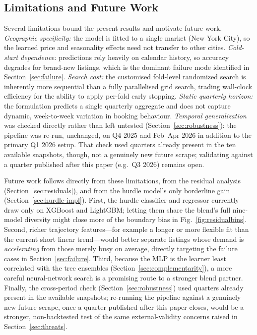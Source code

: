 \documentclass[journal]{IEEEtran}
\begin{document}
\subsection{Limitations and Future Work}
\label{sec:limitations}
Several limitations bound the present results and motivate future work.
\emph{Geographic specificity:} the model is fitted to a single market (New
York City), so the learned price and seasonality effects need not transfer to
other cities. \emph{Cold-start dependence:} predictions rely heavily on
calendar history, so accuracy degrades for brand-new listings, which is the
dominant failure mode identified in Section~\ref{sec:failure}.
\emph{Search cost:} the customised fold-level randomized search is inherently
more sequential than a fully parallelised grid search, trading wall-clock
efficiency for the ability to apply per-fold early stopping.
\emph{Static quarterly horizon:} the formulation predicts a single quarterly
aggregate and does not capture dynamic, week-to-week variation in booking
behaviour. \emph{Temporal generalization} was checked directly rather than
left untested (Section~\ref{sec:robustness}): the pipeline was re-run,
unchanged, on Q4 2025 and Feb--Apr 2026 in addition to the primary Q1 2026
setup. That check used quarters already present in the ten available
snapshots, though, not a genuinely new future scrape; validating against a
quarter published after this paper (e.g.\ Q3 2026) remains open.

Future work follows directly from these limitations, from the residual
analysis (Section~\ref{sec:residuals}), and from the hurdle model's only
borderline gain (Section~\ref{sec:hurdle-impl}). First, the hurdle classifier
and regressor currently draw only on XGBoost and LightGBM; letting them share
the blend's full nine-model diversity might close more of the boundary bias in
Fig.~\ref{fig:residualbins}. Second, richer trajectory features---for example a
longer or more flexible fit than the current short linear trend---would better
separate listings whose demand is \emph{accelerating} from those merely busy on
average, directly targeting the failure cases in Section~\ref{sec:failure}.
Third, because the MLP is the learner least correlated with the tree ensembles
(Section~\ref{sec:complementarity}), a more careful neural-network search is a promising
route to a stronger blend partner. Finally, the cross-period check
(Section~\ref{sec:robustness}) used quarters already present in the available
snapshots; re-running the pipeline against a genuinely new future scrape, once
a quarter published after this paper closes, would be a stronger,
non-backtested test of the same external-validity concerns raised in
Section~\ref{sec:threats}.
\end{document}
